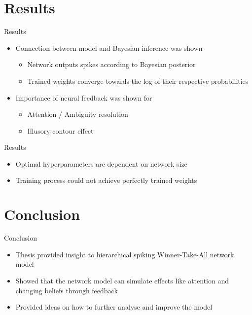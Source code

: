\documentclass[aspectratio=169]{beamer}
\begin{document}
\section{Results}

\begin{frame}{Results}
	\vspace{-0.5cm}
    \begin{itemize}    
    \item Connection between model and Bayesian inference was shown
    \begin{itemize}
      \item Network outputs spikes according to Bayesian posterior
      \item Trained weights converge towards the log of their respective probabilities
    \end{itemize}
    \item Importance of neural feedback was shown for 
    \begin{itemize}
	  \item Attention / Ambiguity resolution
	  \item Illusory contour effect
    \end{itemize}   
  \end{itemize}
\end{frame}

\begin{frame}{Results}
  \begin{itemize}
      \item Optimal hyperparameters are dependent on network size
    \item Training process could not achieve perfectly trained weights 
  \end{itemize}
\end{frame}

\section*{Conclusion}

\begin{frame}{Conclusion}
  \begin{itemize}
	\item Thesis provided insight to hierarchical spiking Winner-Take-All network model
	\item Showed that the network model can simulate effects like attention and changing beliefs through feedback
	\item Provided ideas on how to further analyse and improve the model
  \end{itemize}
\end{frame}
\end{document}
